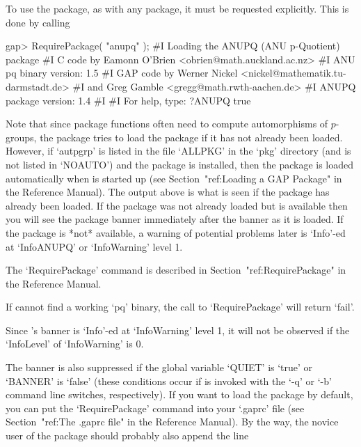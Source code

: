 \endlist


To use the {\ANUPQ} package, as with  any  {\GAP}  package,  it  must  be
requested explicitly. This is done by calling

\beginexample
gap> RequirePackage( "anupq" );
#I    Loading the ANUPQ (ANU p-Quotient) package
#I    C code by  Eamonn O'Brien <obrien@math.auckland.ac.nz>
#I                ANU pq binary version: 1.5
#I    GAP code by Werner Nickel <nickel@mathematik.tu-darmstadt.de>
#I            and   Greg Gamble  <gregg@math.rwth-aachen.de>
#I                ANUPQ package version: 1.4
#I  
#I                For help, type: ?ANUPQ
true
\endexample

Note  that  since  {\ANUPQ}  package  functions  often  need  to  compute
automorphisms  of $p$-groups,  the  {\ANUPQ} package  tries  to load  the
{\AutPGrp}  package if  it  has  not already  been  loaded.  However,  if
`autpgrp' is listed  in the file `ALLPKG' in the  `pkg' directory (and is
not listed in `NOAUTO') and the {\AutPGrp} package is installed, then the
{\AutPGrp} package is loaded automatically when {\GAP} is started up (see
Section~"ref:Loading a GAP Package"  in the Reference Manual). The output
above is what is seen if  the {\AutPGrp} package has already been loaded. 
If the  {\AutPGrp} package was not  already loaded but  is available then
you will see the {\AutPGrp} package banner immediately after the {\ANUPQ}
banner as it is loaded.  If  the {\AutPGrp} package is *not* available, a
warning  of  potential problems  later  is  `Info'-ed  at `InfoANUPQ'  or
`InfoWarning' level 1.

The `RequirePackage' command is described in Section~"ref:RequirePackage"
in the {\GAP} Reference Manual.

If {\GAP} cannot find a working `pq' binary, the call to `RequirePackage'
will return `fail'.

Since {\ANUPQ}'s banner is `Info'-ed at `InfoWarning' level  1,  it  will
not be observed if the `InfoLevel' of `InfoWarning' is 0.

The banner is also suppressed if the global {\GAP}  variable  `QUIET'  is
`true' or `BANNER' is  `false'  (these  conditions  occur  if  {\GAP}  is
invoked with the `-q' or `-b' command line  switches,  respectively).  If
you want to load the  {\ANUPQ}  package  by  default,  you  can  put  the
`RequirePackage' command into your `.gaprc'  file  (see  Section~"ref:The
.gaprc file" in the {\GAP} Reference Manual). By the way, the novice user
of the {\ANUPQ} package should probably also append the line

